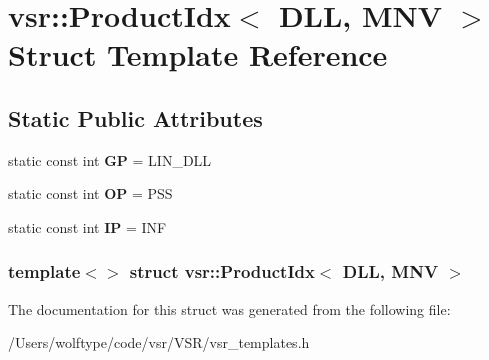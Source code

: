 \hypertarget{structvsr_1_1_product_idx_3_01_d_l_l_00_01_m_n_v_01_4}{\section{vsr\-:\-:Product\-Idx$<$ D\-L\-L, M\-N\-V $>$ Struct Template Reference}
\label{structvsr_1_1_product_idx_3_01_d_l_l_00_01_m_n_v_01_4}
}
\subsection*{Static Public Attributes}
\begin{DoxyCompactItemize}
\item 
\hypertarget{structvsr_1_1_product_idx_3_01_d_l_l_00_01_m_n_v_01_4_addab604ef01b3bfd6d03ce4374978ed2}{static const int {\bfseries G\-P} = L\-I\-N\-\_\-\-D\-L\-L}\label{structvsr_1_1_product_idx_3_01_d_l_l_00_01_m_n_v_01_4_addab604ef01b3bfd6d03ce4374978ed2}

\item 
\hypertarget{structvsr_1_1_product_idx_3_01_d_l_l_00_01_m_n_v_01_4_a398397dcc363b6428cff6d96114e9803}{static const int {\bfseries O\-P} = P\-S\-S}\label{structvsr_1_1_product_idx_3_01_d_l_l_00_01_m_n_v_01_4_a398397dcc363b6428cff6d96114e9803}

\item 
\hypertarget{structvsr_1_1_product_idx_3_01_d_l_l_00_01_m_n_v_01_4_aa9f8b73d12422c585ff1e1a6df7f8339}{static const int {\bfseries I\-P} = I\-N\-F}\label{structvsr_1_1_product_idx_3_01_d_l_l_00_01_m_n_v_01_4_aa9f8b73d12422c585ff1e1a6df7f8339}

\end{DoxyCompactItemize}
\subsubsection*{template$<$$>$ struct vsr\-::\-Product\-Idx$<$ D\-L\-L, M\-N\-V $>$}



The documentation for this struct was generated from the following file\-:\begin{DoxyCompactItemize}
\item 
/\-Users/wolftype/code/vsr/\-V\-S\-R/vsr\-\_\-templates.\-h\end{DoxyCompactItemize}
